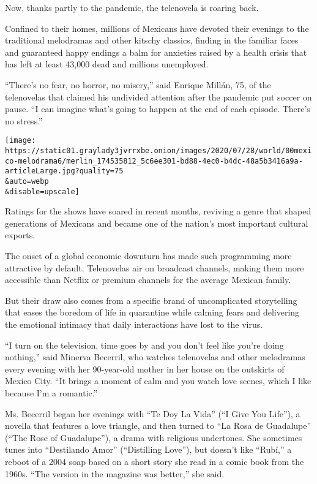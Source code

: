 Now, thanks partly to the pandemic, the telenovela is roaring back.

Confined to their homes, millions of Mexicans have devoted their
evenings to the traditional melodramas and other kitschy classics,
finding in the familiar faces and guaranteed happy endings a balm for
anxieties raised by a health crisis that has left at least 43,000 dead
and millions unemployed.

``There's no fear, no horror, no misery,'' said Enrique Millán, 75, of
the telenovelas that claimed his undivided attention after the pandemic
put soccer on pause. ``I can imagine what's going to happen at the end
of each episode. There's no stress.''

\texttt{[image: https://static01.graylady3jvrrxbe.onion/images/2020/07/28/world/00mexico-melodrama6/merlin\_174535812\_5c6ee301-bd88-4ec0-b4dc-48a5b3416a9a-articleLarge.jpg?quality=75\\\&auto=webp\\\&disable=upscale]}

Ratings for the shows have soared in recent months, reviving a genre
that shaped generations of Mexicans and became one of the nation's most
important cultural exports.

The onset of a global economic downturn has made such programming more
attractive by default. Telenovelas air on broadcast channels, making
them more accessible than Netflix or premium channels for the average
Mexican family.

But their draw also comes from a specific brand of uncomplicated
storytelling that eases the boredom of life in quarantine while calming
fears and delivering the emotional intimacy that daily interactions have
lost to the virus.

``I turn on the television, time goes by and you don't feel like you're
doing nothing,'' said Minerva Becerril, who watches telenovelas and
other melodramas every evening with her 90-year-old mother in her house
on the outskirts of Mexico City. ``It brings a moment of calm and you
watch love scenes, which I like because I'm a romantic.''

Ms. Becerril began her evenings with ``Te Doy La Vida'' (``I Give You
Life''), a novella that features a love triangle, and then turned to
``La Rosa de Guadalupe'' (``The Rose of Guadalupe''), a drama with
religious undertones. She sometimes tunes into ``Destilando Amor''
(``Distilling Love''), but doesn't like ``Rubí,'' a reboot of a 2004
soap based on a short story she read in a comic book from the 1960s.
``The version in the magazine was better,'' she said.

